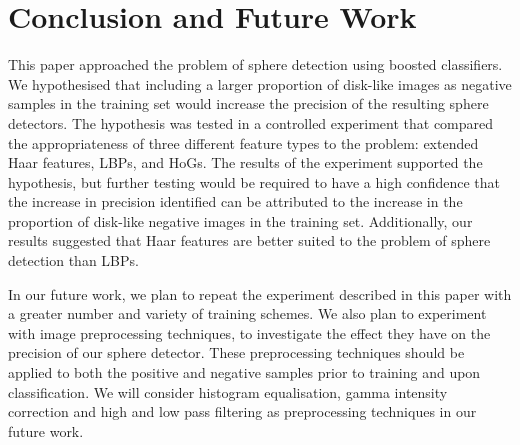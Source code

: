 \documentclass{sig-alternate-05-2015}
\newcommand{\citep}[1]{\cite{#1}}
\begin{document}
	\section{Conclusion and Future Work} {
	\label{sec:conclusion}


		This paper approached the problem of sphere detection using boosted classifiers.
		We hypothesised that including a larger proportion of disk-like images as negative samples in the training set would increase the precision of the resulting sphere detectors.
		The hypothesis was tested in a controlled experiment that compared the appropriateness of three different feature types to the problem: extended Haar features, LBPs, and HoGs.
		The results of the experiment supported the hypothesis, but further testing would be required to have a high confidence that the increase in precision identified can be attributed to the increase in the proportion of disk-like negative images in the training set.
		Additionally, our results suggested that Haar features are better suited to the problem of sphere detection than LBPs.

		In our future work, we plan to repeat the experiment described in this paper with a greater number and variety of training schemes. We also plan to experiment with image preprocessing techniques, to investigate the effect they have on the precision of our sphere detector. These preprocessing techniques should be applied to both the positive and negative samples prior to training and upon classification. We will consider histogram equalisation, gamma intensity correction and high and low pass filtering \citep{gross2003image} as preprocessing techniques in our future work.

	}

	
\end{document}
